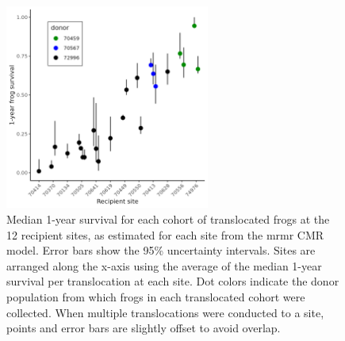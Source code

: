 \documentclass[9pt,twocolumn,twoside,lineno]{pnas-new}
\begin{document}
\newpage

\begin{figure}

{\centering \includegraphics[width=0.60\textwidth]{figures/translocation_survival_bysiteid.png}

}

\caption{\label{fig-translocation-survival}Median 1-year survival for
each cohort of translocated frogs at the 12 recipient sites, as
estimated for each site from the mrmr CMR model. Error bars show the
95\% uncertainty intervals. Sites are arranged along the x-axis using
the average of the median 1-year survival per translocation at each
site. Dot colors indicate the donor population from which frogs in each
translocated cohort were collected. When multiple translocations were
conducted to a site, points and error bars are slightly offset to avoid
overlap.}

\end{figure}

\newpage
\end{document}
